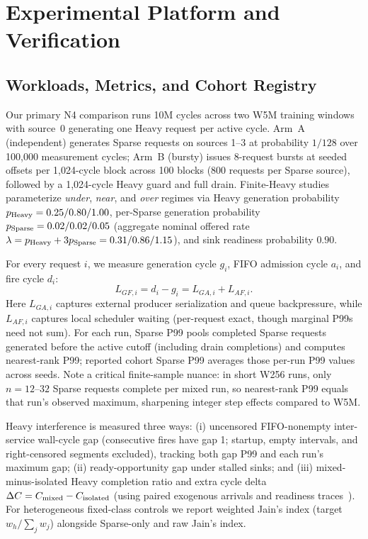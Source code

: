 \section{Experimental Platform and Verification}
\label{sec:method}

\subsection{Workloads, Metrics, and Cohort Registry}
Our primary N4 comparison runs 10M cycles across two W5M training windows with source~0 generating one Heavy request per active cycle. Arm~A (independent) generates Sparse requests on sources 1--3 at probability $1/128$ over 100,000 measurement cycles; Arm~B (bursty) issues 8-request bursts at seeded offsets per 1,024-cycle block across 100 blocks (800 requests per Sparse source), followed by a 1,024-cycle Heavy guard and full drain. Finite-Heavy studies parameterize \emph{under}, \emph{near}, and \emph{over} regimes via Heavy generation probability $p_{\rm Heavy}=0.25/0.80/1.00$, per-Sparse generation probability $p_{\rm Sparse}=0.02/0.02/0.05$ (aggregate nominal offered rate $\lambda=p_{\rm Heavy}+3p_{\rm Sparse}=0.31/0.86/1.15$), and sink readiness probability $0.90$.

For every request $i$, we measure generation cycle $g_i$, FIFO admission cycle $a_i$, and fire cycle $d_i$:
\begin{equation}
L_{GF,i} = d_i - g_i = L_{GA,i} + L_{AF,i}.
\label{eq:latency-v3}
\end{equation}
Here $L_{GA,i}$ captures external producer serialization and queue backpressure, while $L_{AF,i}$ captures local scheduler waiting (per-request exact, though marginal P99s need not sum). For each run, Sparse P99 pools completed Sparse requests generated before the active cutoff (including drain completions) and computes nearest-rank P99; reported cohort Sparse P99 averages those per-run P99 values across seeds. Note a critical finite-sample nuance: in short W256 runs, only $n=12\text{--}32$ Sparse requests complete per mixed run, so nearest-rank P99 equals that run's observed maximum, sharpening integer step effects compared to W5M.

Heavy interference is measured three ways: (i) uncensored FIFO-nonempty inter-service wall-cycle gap (consecutive fires have gap 1; startup, empty intervals, and right-censored segments excluded), tracking both gap P99 and each run's maximum gap; (ii) ready-opportunity gap under stalled sinks; and (iii) mixed-minus-isolated Heavy completion ratio and extra cycle delta $\Delta C = C_{\rm mixed} - C_{\rm isolated}$ (using paired exogenous arrivals and readiness traces~\cite{stfm}). For heterogeneous fixed-class controls we report weighted Jain's index (target $w_h/\sum_j w_j$) alongside Sparse-only and raw Jain's index.

